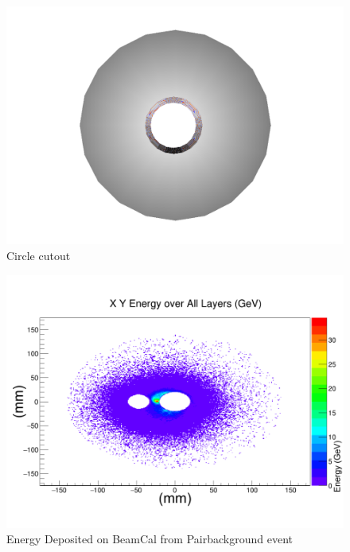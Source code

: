 \documentclass{report}
\begin{document}
\begin{figure}[h]
\begin{minipage}{0.3\textwidth}
                        \label{beamcal_wedge}
                    \end{minipage}
                    \begin{minipage}{0.3\textwidth}
                        \includegraphics[width=\textwidth]{beamcal_circle}
                        \caption{Circle cutout}
                        \label{beamcal_circle}
                    \end{minipage}
                \end{figure}

                \begin{figure}[h]
                    \centering
                    \includegraphics[width=\textwidth]{beamcal_energy_xy}
                    \caption{Energy Deposited on BeamCal from Pairbackground event}
                    \label{beamcal_energy_xy}
                \end{figure}
\end{document}
